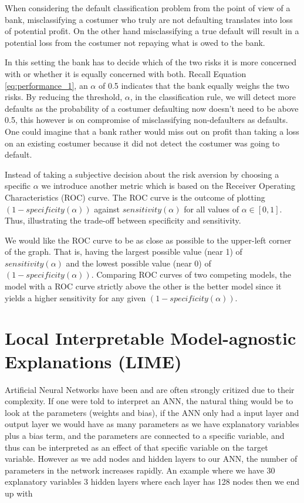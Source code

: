  When considering the default classification problem from the point of view of a bank, misclassifying a costumer who truly are not defaulting translates into loss of potential profit. On the other hand misclassifying a true default will result in a potential loss from the costumer not repaying what is owed to the bank. 
 
 In this setting the bank has to decide which of the two risks it is more concerned with or whether it is equally concerned with both. Recall Equation \eqref{eq:performance_1}, an $\alpha$ of 0.5 indicates that the bank equally weighs the two risks. By reducing the threshold, $\alpha$, in the classification rule, we will detect more defaults as the probability of a costumer defaulting now doesn't need to be above 0.5, this however is on compromise of misclassifying non-defaulters as defaults. One could imagine that a bank rather would miss out on profit than taking a loss on an existing costumer because it did not detect the costumer was going to default. 
 
 Instead of taking a subjective decision about the risk aversion by choosing a specific $\alpha$ we introduce another metric which is based on the Receiver Operating Characteristics (ROC) curve. The ROC curve is the outcome of plotting $(1-specificity(\alpha))$ against $sensitivity(\alpha)$ for all values of $\alpha \in [0,1]$. Thus, illustrating the trade-off between specificity and sensitivity.
 
 We would like the ROC curve to be as close as possible to the upper-left corner of the graph. That is, having the largest possible value (near 1) of $sensitivity(\alpha)$ and the lowest possible value (near 0) of $(1-specificity(\alpha))$. 
 Comparing ROC curves of two competing models, the model with a ROC curve strictly above the other is the better model since it yields a higher sensitivity for any given $(1-specificity(\alpha))$.

 \section{Local Interpretable Model-agnostic Explanations (LIME)}

Artificial Neural Networks have been and are often strongly critized due to their complexity. If one were told to interpret an ANN, the natural thing would be to look at the parameters (weights and bias), if the ANN only had a input layer and output layer we would have as many parameters as we have explanatory variables plus a bias term, and the parameters are connected to a specific variable, and thus can be interpreted as an effect of that specific variable on the target variable. However as we add nodes and hidden layers to our ANN, the number of parameters in the network increases rapidly. An example where we have 30 explanatory variables 3 hidden layers where each layer has 128 nodes then we end up with 

